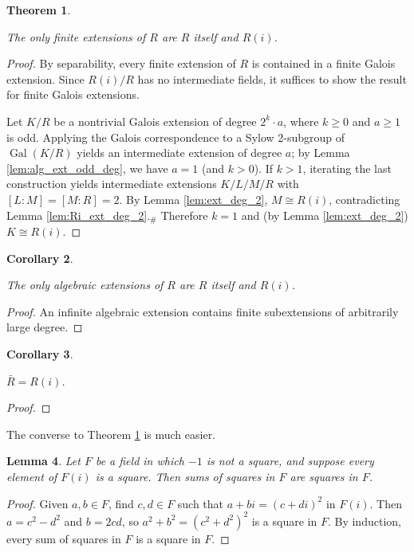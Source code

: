\documentclass{article}
\newtheorem{theorem}{Theorem}[section]
\newtheorem{lemma}[theorem]{Lemma}
\newtheorem{corollary}[theorem]{Corollary}
\newcommand{\Gal}{\operatorname{Gal}}
\newcommand{\leanok}{}
\newcommand{\lean}[1]{}
\newcommand{\uses}[1]{}
\begin{document}
\begin{theorem}
  \label{thm:FTAlg}
  \uses{def:RCF}
  \lean{IsRealClosed.finrank_eq_one_or_two_of_finite}
  \leanok
  The only finite extensions of $R$ are $R$ itself and $R(i)$.
\end{theorem}
\begin{proof}
  \uses{lem:ext_deg_2, lem:Ri_ext_deg_2, lem:alg_ext_odd_deg}
  \leanok
  By separability, every finite extension of $R$ is contained in a finite Galois extension. Since $R(i)/R$ has no intermediate fields, it suffices to show the result for finite Galois extensions.

  Let $K/R$ be a nontrivial Galois extension of degree $2^k\cdot a$, where $k\geq 0$ and $a\geq1$ is odd. Applying the Galois correspondence to a Sylow 2-subgroup of $\Gal(K/R)$ yields an intermediate extension of degree $a$; by Lemma \ref{lem:alg_ext_odd_deg}, we have $a=1$ (and $k>0$). If $k>1$, iterating the last construction yields intermediate extensions $K/L/M/R$ with $[L:M]=[M:R]=2$. By Lemma \ref{lem:ext_deg_2}, $M\cong R(i)$, contradicting Lemma \ref{lem:Ri_ext_deg_2}.$_\#$ Therefore $k=1$ and (by Lemma \ref{lem:ext_deg_2}) $K\cong R(i)$.
\end{proof}

\begin{corollary}
  \label{cor:FTAlg_alg}
  \uses{def:RCF}
  \lean{IsRealClosed.finite_of_isAlgebraic, IsRealClosed.finrank_eq_one_or_two_of_finite}
  \leanok
  The only algebraic extensions of $R$ are $R$ itself and $R(i)$.
\end{corollary}
\begin{proof}
  \uses{thm:FTAlg}
  \leanok
  An infinite algebraic extension contains finite subextensions of arbitrarily large degree.
\end{proof}

\begin{corollary}
  \label{cor:RCF_ac}
  \uses{def:RCF}
  \lean{IsRealClosed.isAlgClosure_adjoinRoot_X_sq_add_one}
  \leanok
  $\bar{R}=R(i)$.
\end{corollary}
\begin{proof}
  \uses{cor:FTAlg_alg}
  \leanok
\end{proof}

The converse to Theorem \ref{thm:FTAlg} is much easier.

\begin{lemma}
  \label{lem:sumsq_is_sq}
  Let $F$ be a field in which $-1$ is not a square, and suppose every element of $F(i)$ is a square. Then sums of squares in $F$ are squares in $F$.
\end{lemma}
\begin{proof}
  Given $a,b\in F$, find $c,d\in F$ such that $a+bi=(c+di)^2$ in $F(i)$. Then $a=c^2-d^2$ and $b=2cd$, so $a^2+b^2=(c^2+d^2)^2$ is a square in $F$. By induction, every sum of squares in $F$ is a square in $F$.
\end{proof}
\end{document}

